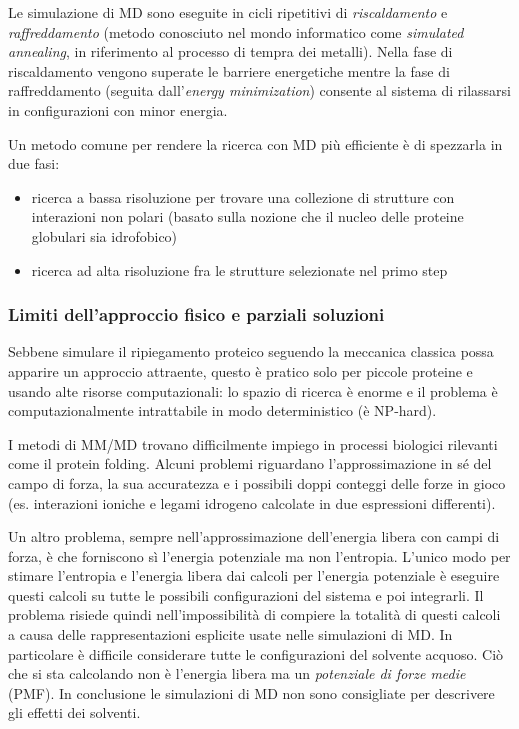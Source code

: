 {\par Le simulazione di MD sono eseguite in cicli ripetitivi di \textit{riscaldamento} e \textit{raffreddamento} (metodo conosciuto nel mondo informatico come \textit{simulated annealing}, in riferimento al processo di tempra dei metalli). Nella fase di riscaldamento vengono superate le barriere energetiche mentre la fase di raffreddamento (seguita dall'\textit{energy minimization}) consente al sistema di rilassarsi in configurazioni con minor energia.

\par Un metodo comune per rendere la ricerca con MD più efficiente è di spezzarla in due fasi:
\begin{itemize}
	\item ricerca a bassa risoluzione per trovare una collezione di strutture con interazioni non polari (basato sulla nozione che il nucleo delle proteine globulari sia idrofobico)
	\item ricerca ad alta risoluzione fra le strutture selezionate nel primo step
\end{itemize}

\subsubsection{Limiti dell'approccio fisico e parziali soluzioni}
Sebbene simulare il ripiegamento proteico seguendo la meccanica classica possa apparire un approccio attraente, questo è pratico solo per piccole proteine e usando alte risorse computazionali: lo spazio di ricerca è enorme e il problema è computazionalmente intrattabile in modo deterministico (è NP-hard)\supercite{abbass2020enhancing}.

\par I metodi di MM/MD trovano difficilmente impiego in processi biologici rilevanti come il protein folding. Alcuni problemi riguardano l'approssimazione in sé del campo di forza, la sua accuratezza e i possibili doppi conteggi delle forze in gioco (es. interazioni ioniche e legami idrogeno calcolate in due espressioni differenti). 

\par Un altro problema, sempre nell'approssimazione dell'energia libera con campi di forza, è che forniscono sì l'energia potenziale ma non l'entropia. L'unico modo per stimare l'entropia e l'energia libera dai calcoli per l'energia potenziale è eseguire questi calcoli su tutte le possibili configurazioni del sistema e poi integrarli. Il problema risiede quindi nell'impossibilità di compiere la totalità di questi calcoli a causa delle rappresentazioni esplicite usate nelle simulazioni di MD. In particolare è difficile considerare tutte le configurazioni del solvente acquoso. Ciò che si sta calcolando non è l'energia libera ma un \textit{potenziale di forze medie} (PMF). In conclusione le simulazioni di MD non sono consigliate per descrivere gli effetti dei solventi.

}
